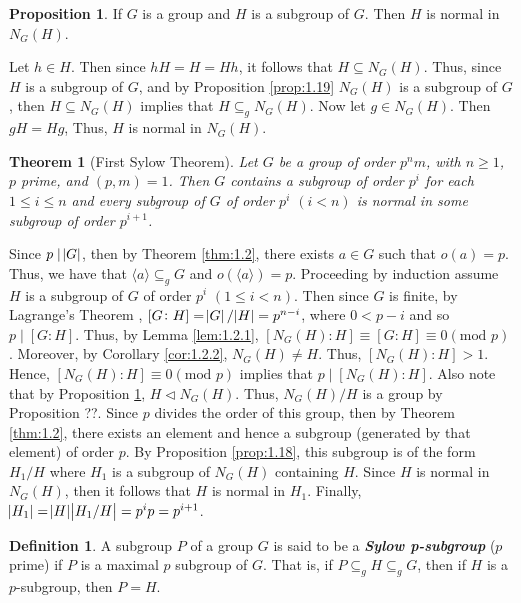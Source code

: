 \documentclass{article}
\makeatletter
\newtheorem{theorem}{Theorem}[section]
\theoremstyle{definition}
\newtheorem{prop}{Proposition}[section]
\newtheorem{definition}{Definition}[section]
\theoremstyle{remark}
\let\oldproofname=\proofname
\renewcommand{\proofname}{\bf{\textit{\oldproofname}}}
\theoremstyle{definition}
\renewenvironment{proof}[1][\proofname]{\par
  \pushQED{\qed}%
  \normalfont \topsep6\p@\@plus6\p@\relax
  \list{}{\leftmargin=0mm
          \rightmargin=0mm
          \settowidth{\itemindent}{\itshape#1}%
          \labelwidth=4mm
          \parsep=0pt \listparindent=0mm%
  }
  \item[\hskip\labelsep
        \itshape
    #1\@addpunct{.}]\ignorespaces
}{%
  \popQED\endlist\@endpefalse
}
\makeatother
\begin{document}
    \begin{prop}\label{prop:1.20}
        If $G$ is a group and $H$ is a subgroup of $G$. Then $H$ is normal in $N_G(H)$.
    \end{prop}
        \begin{proof}
            Let $h\in H$. Then since $hH=H=Hh$, it follows that $H\subseteq N_G(H)$. Thus, since $H$ is a subgroup of $G$, and by Proposition \ref{prop:1.19} $N_G(H)$ is a subgroup of $G$, then $H\subseteq N_G(H)$ implies that $H\subseteq_g N_G(H)$. Now let $g\in N_G(H)$. Then $gH=Hg$, Thus, $H$ is normal in $N_G(H)$.
        \end{proof}
        
    \begin{theorem}[First Sylow Theorem]\label{thm:1.3}
        Let $G$ be a group of order $p^nm$, with $n\geq 1$, $p$ prime, and $(p,m)=1$. Then $G$ contains a subgroup of order $p^i$ for each $1\leq i\leq n$ and every subgroup of $G$ of order $p^i$ $(i<n)$ is normal in some subgroup of order $p^{i+1}$.
    \end{theorem}
        \begin{proof}
            Since $p\mid\abs{G}$, then by Theorem \ref{thm:1.2}, there exists $a\in G$ such that $o(a)=p$. Thus, we have that $\langle a\rangle\subseteq_g G$ and $o(\langle a\rangle)=p$. Proceeding by induction assume $H$ is a subgroup of $G$ of order $p^i$ $(1\leq i<n)$. Then since $G$ is finite, by Lagrange's Theorem , $[G\colon H]=\abs{G}/\abs{H}=p^{n-i}$, where $0<p-i$ and so $p\mid[G\colon H]$. Thus, by Lemma \ref{lem:1.2.1}, $[N_G(H)\colon H]\equiv[G\colon H]\equiv 0(\text{mod }p)$. Moreover, by Corollary \ref{cor:1.2.2}, $N_G(H)\neq H$. Thus, $[N_G(H)\colon H]>1$. Hence, $[N_G(H)\colon H]\equiv 0(\text{mod }p)$ implies that $p\mid[N_G(H)\colon H]$. Also note that by Proposition \ref{prop:1.20}, $H\triangleleft N_G(H)$. Thus, $N_G(H)/H$ is a group by Proposition ??. Since $p$ divides the order of this group, then by Theorem \ref{thm:1.2}, there exists an element and hence a subgroup (generated by that element) of order $p$. By Proposition \ref{prop:1.18}, this subgroup is of the form $H_1/H$ where $H_1$ is a subgroup of $N_G(H)$ containing $H$. Since $H$ is normal in $N_G(H)$, then it follows that $H$ is normal in $H_1$. Finally, $\abs{H_1}=\abs{H}\abs{H_1/H}=p^ip=p^{i+1}$.
        \end{proof}
        
    \begin{definition}\label{def:1.7}
        A subgroup $P$ of a group $G$ is said to be a \textbf{\textit{Sylow p-subgroup}} ($p$ prime) if $P$ is a maximal $p$ subgroup of $G$. That is, if $P\subseteq_g H\subseteq_g G$, then if $H$ is a $p$-subgroup, then $P=H$.
    \end{definition}
    
\end{document}
